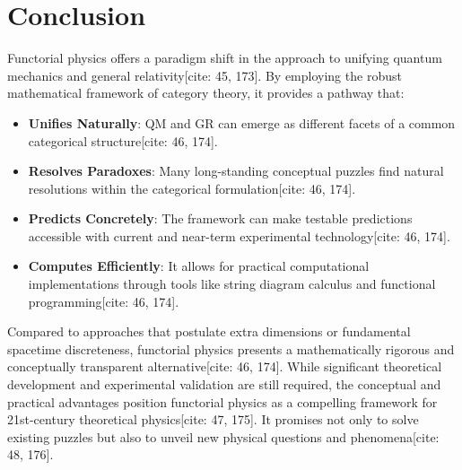 \documentclass[11pt,a4paper]{article}
\begin{document}
\section{Conclusion}
Functorial physics offers a paradigm shift in the approach to unifying quantum mechanics and general relativity[cite: 45, 173]. By employing the robust mathematical framework of category theory, it provides a pathway that:
\begin{itemize}
    \item \textbf{Unifies Naturally}: QM and GR can emerge as different facets of a common categorical structure[cite: 46, 174].
    \item \textbf{Resolves Paradoxes}: Many long-standing conceptual puzzles find natural resolutions within the categorical formulation[cite: 46, 174].
    \item \textbf{Predicts Concretely}: The framework can make testable predictions accessible with current and near-term experimental technology[cite: 46, 174].
    \item \textbf{Computes Efficiently}: It allows for practical computational implementations through tools like string diagram calculus and functional programming[cite: 46, 174].
\end{itemize}
Compared to approaches that postulate extra dimensions or fundamental spacetime discreteness, functorial physics presents a mathematically rigorous and conceptually transparent alternative[cite: 46, 174]. While significant theoretical development and experimental validation are still required, the conceptual and practical advantages position functorial physics as a compelling framework for 21st-century theoretical physics[cite: 47, 175]. It promises not only to solve existing puzzles but also to unveil new physical questions and phenomena[cite: 48, 176].
\end{document}
